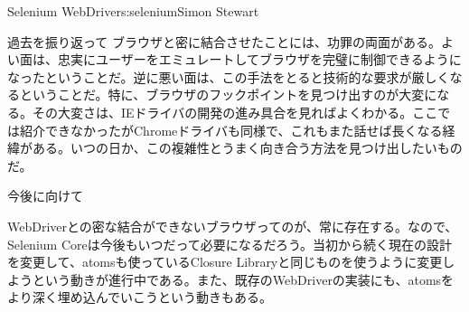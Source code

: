 \begin{aosachapter}{Selenium WebDriver}{s:selenium}{Simon Stewart}
\begin{aosasect1}{過去を振り返って}
ブラウザと密に結合させたことには、功罪の両面がある。よい面は、忠実にユーザーをエミュレートしてブラウザを完璧に制御できるようになったということだ。逆に悪い面は、この手法をとると技術的な要求が厳しくなるということだ。特に、ブラウザのフックポイントを見つけ出すのが大変になる。その大変さは、IEドライバの開発の進み具合を見ればよくわかる。ここでは紹介できなかったがChromeドライバも同様で、これもまた話せば長くなる経緯がある。いつの日か、この複雑性とうまく向き合う方法を見つけ出したいものだ。

\end{aosasect1}

\begin{aosasect1}{今後に向けて}

WebDriverとの密な結合ができないブラウザってのが、常に存在する。なので、Selenium Coreは今後もいつだって必要になるだろう。当初から続く現在の設計を変更して、atomsも使っているClosure Libraryと同じものを使うように変更しようという動きが進行中である。また、既存のWebDriverの実装にも、atomsをより深く埋め込んでいこうという動きもある。


\end{aosasect1}
\end{aosachapter}
